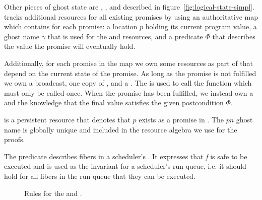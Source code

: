 Other pieces of ghost state are \gsPInvIn{}, \gsIsPr{}, and \gsReady{} described in figure~\ref{fig:logical-state-simpl}.
\gsPInvIn{} tracks additional resources for all existing promises by using an authoritative map which contains for each promise:
a location \(p\) holding its current program value,
a ghost name \(\gamma\) that is used for the \gspwait{} and \gspdone{} resources,
and a predicate \(Φ\) that describes the value the promise will eventually hold.

Additionally, for each promise in the map we own some resources as part of \gsPInvIn{} that depend on the current state of the promise.
As long as the promise is not fulfilled we own a broadcast, one copy of \gspwait{}, and a \gssignal{}.
The \gssignal{} is used to call the  function which must only be called once.
When the promise has been fulfilled, we instead own a \gspdone{} and the knowledge that the final value satisfies the given postcondition \(Φ\).

\gsIsPr{} is a persistent resource that denotes that \(p\) exists as a promise in \gsPInvIn{}. The \(pn\) ghost name is globally unique and included in the resource algebra we use for the proofs.

The \gsReady{} predicate describes fibers in a scheduler's .
It expresses that \emph{f} is safe to be executed and is used as the invariant for a scheduler's run queue, i.e. it should hold for all fibers in the run queue that they can be executed.

\begin{figure}
    \caption{Rules for the \gspwait{} and \gspdone{}.}
    \label{fig:promise-state-rules}\label{spec:ps_contra}
\end{figure}

